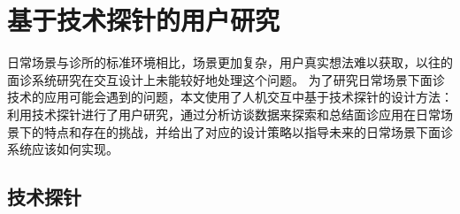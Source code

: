 \chapter{基于技术探针的用户研究}

日常场景与诊所的标准环境相比，场景更加复杂，用户真实想法难以获取，以往的面诊系统研究在交互设计上未能较好地处理这个问题。
为了研究日常场景下面诊技术的应用可能会遇到的问题，本文使用了人机交互中基于技术探针的设计方法：利用技术探针进行了用户研究，通过分析访谈数据来探索和总结面诊应用在日常场景下的特点和存在的挑战，并给出了对应的设计策略以指导未来的日常场景下面诊系统应该如何实现。

\section{技术探针}
\label{sec:diagnose_model}

%


%

